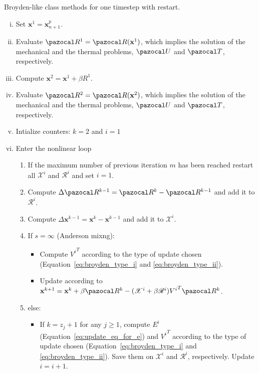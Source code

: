 \begin{framedbox}[htb]
  \caption{Broyden-like class methods for one timestep with restart.}
  \label{box:broydens_family}
  \begin{center}
     \begin{minipage}{0.9\textwidth}
     \begin{enumerate}[(i)]
     \item Set \(\mathbf x^1 = \mathbf x_{n+ 1}^p\).
     \item Evaluate \(\pazocal R^1 = \pazocal R(\mathbf x^1)\), which implies the solution of the mechanical and the thermal problems, \(\pazocal U\) and \(\pazocal T\), respectively.
     \item Compute \(\mathbf x^2 = \mathbf x^1 + \beta R^1\).
     \item Evaluate \(\pazocal R^{2} = \pazocal R(\mathbf x^{2})\), which implies the solution of the mechanical and the thermal problems, \(\pazocal U\) and \(\pazocal T\), respectively.
     \item Intialize counters: \(k=2\) and \(i=1\)
     \item Enter the nonlinear loop
     \begin{enumerate}[(1)]
       \item If the maximum number of previous iteration \(m\) has been reached restart all \(\mathscr X^i\) and \(\mathscr R^i\) and set \(i=1\).
       \item Compute \(\Delta \pazocal R^{k-1} = \pazocal R^{k} - \pazocal R^{k-1}\) and add it to \(\mathscr R^i\).
       \item Compute \(\Delta \mathbf x^{k-1} = \mathbf x^{k} -\mathbf x^{k-1} \) and add it to \(\mathscr X^i\).
      \item If \(s=\infty\) (Anderson mixng):
      \begin{itemize}
        \item Compute \({V^i}^T\) according to the type of update chosen (Equation~\eqref{eq:broyden_type_i} and \eqref{eq:broyden_type_ii}).
        \item Update according to \(\mathbf x^{k+1} = \mathbf x^k + \beta \pazocal R^k - (\mathscr X^i + \beta\mathscr R^i){V^i}^T\pazocal R^k\).
      \end{itemize}
      \item else:
      \begin{itemize}
        \item If \(k= z_j + 1\) for any \(j\geq 1\), compute \(E^i\) (Equation~\eqref{eq:update_eq_for_e}) and \({ V^i}^T\) according to the type of update chosen (Equation~\eqref{eq:broyden_type_i} and \eqref{eq:broyden_type_ii}). Save them on \(\mathscr X^i\) and \(\mathscr R^i\), respectively. Update \(i=i+1\).

\end{itemize}
\end{enumerate}
\end{enumerate}
\end{minipage}
\end{center}
\end{framedbox}
